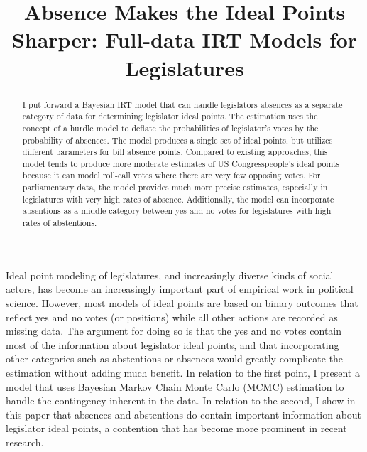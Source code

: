 
%
\title{Absence Makes the Ideal Points Sharper: Full-data IRT Models for Legislatures}
\usepackage{amsmath,amsthm, amssymb, latexsym}
\linespread{1.5}

	
	\maketitle
	
	\begin{abstract}
		I put forward a Bayesian IRT model that can handle legislators absences as a separate category of data for determining legislator ideal points. The estimation uses the concept of a hurdle model to deflate the probabilities of legislator’s votes by the probability of absences. The model produces a single set of ideal points, but utilizes different parameters for bill absence points. Compared to existing approaches, this model tends to produce more moderate estimates of US Congresspeople’s ideal points because it can model roll-call votes where there are very few opposing votes. For parliamentary data, the model provides much more precise estimates, especially in legislatures with very high rates of absence. Additionally, the model can incorporate absentions as a middle category between yes and no votes for legislatures with high rates of abstentions.
	\end{abstract}
	
	Ideal point modeling of legislatures, and increasingly diverse kinds of social actors, has become an increasingly important part of empirical work in political science. However, most models of ideal points are based on binary outcomes that reflect yes and no votes (or positions) while all other actions are recorded as missing data. The argument for doing so is that the yes and no votes contain most of the information about legislator ideal points, and that incorporating other categories such as abstentions or absences would greatly complicate the estimation without adding much benefit. In relation to the first point, I present a model that uses Bayesian Markov Chain Monte Carlo (MCMC) estimation to handle the contingency inherent in the data. In relation to the second, I show in this paper that absences and abstentions do contain important information about legislator ideal points, a contention that has become more prominent in recent research.
	

